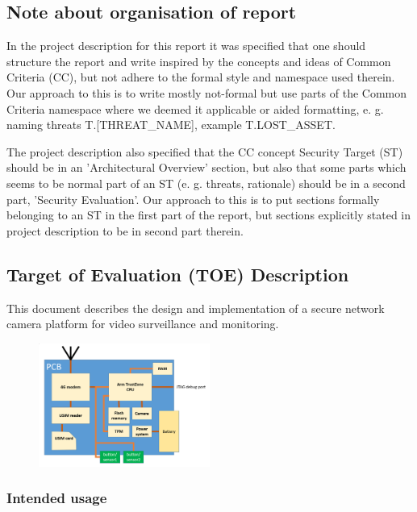 \documentclass[10pt]{article}
\begin{document}
    \subsection{Note about organisation of report}
      \footnotesize{In the project description for this report it was specified that one should 
      structure the report and write inspired by the concepts and ideas of Common Criteria (CC),
	but not adhere to the formal style and namespace used therein. 
	Our approach to this is to write mostly not-formal but use parts of
	the Common Criteria namespace where we deemed it applicable or aided formatting, 
	e. g. naming threats T.[THREAT\_NAME], example T.LOST\_ASSET. 

	The project description also specified that the CC concept Security Target (ST)
	should be in an 'Architectural Overview' section, but also that some parts 
	which seems to be normal part of an ST (e. g. threats, rationale) \cite{stwiki} should be in a
	second part, 'Security Evaluation'. Our approach to this is to put sections formally 
	belonging to an ST in the first part of the report, but sections explicitly stated in project description 
	to be in second part therein.}

    \subsection{Target of Evaluation (TOE) Description}

      This document describes the design and implementation of a secure network
      camera platform for video surveillance and monitoring.

      \begin{figure}[!h]
        \center
        \includegraphics[width=0.5\textwidth]{input/pcb_camera.png}
      \end{figure}

      \subsubsection{Intended usage}
\end{document}
